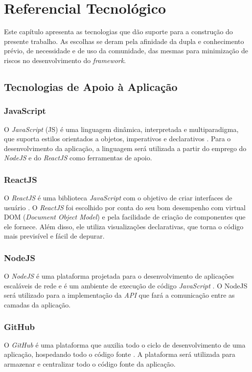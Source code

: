 \chapter[Referencial Tecnológico]{Referencial Tecnológico}

Este capítulo apresenta as tecnologias que dão suporte para a construção do presente trabalho. As escolhas se deram pela afinidade da dupla e conhecimento prévio, de necessidade e de uso da comunidade, das mesmas para minimização de riscos no desenvolvimento do \textit{framework}.

\section{Tecnologias de Apoio à Aplicação}

\subsection{JavaScript}
O \textit{JavaScript} (JS) é uma linguagem dinâmica, interpretada e multiparadigma, que suporta estilos orientados a objetos, imperativos e declarativos \cite{javascript}. Para o desenvolvimento da aplicação, a linguagem será utilizada a partir do emprego do \textit{NodeJS} e do \textit{ReactJS} como ferramentas de apoio.

\subsection{ReactJS}
O \textit{ReactJS} é uma biblioteca \textit{JavaScript} com o objetivo de criar interfaces de usuário \cite{reactjs}. O \textit{ReactJS} foi escolhido por conta do seu bom desempenho com virtual DOM (\textit{Document Object Model}) e pela facilidade de criação de componentes que ele fornece. Além disso, ele utiliza visualizações declarativas, que torna o código mais previsível e fácil de depurar.

\subsection{NodeJS}
O \textit{NodeJS} é uma plataforma projetada para o desenvolvimento de aplicações escaláveis de rede e é um ambiente de execução de código \textit{JavaScript} \cite{nodejs}. O NodeJS será utilizado para a implementação da \textit{API} que fará a comunicação entre as camadas da aplicação.

\subsection{GitHub}
O \textit{GitHub} é uma plataforma que auxilia todo o ciclo de desenvolvimento de uma aplicação, hospedando todo o código fonte \cite{github}. A plataforma será utilizada para armazenar e centralizar todo o código fonte da aplicação.

